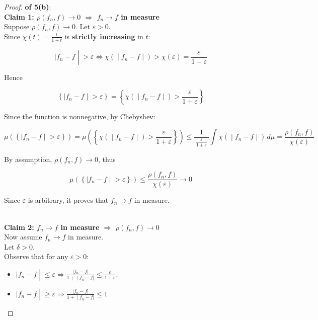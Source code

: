 \begin{proof}

\textbf{of 5(b)}:\\
\textbf{Claim 1: \(\rho(f_{n},f)\rightarrow 0\) \(\Longrightarrow\) \(f_{n}\rightarrow f\) in measure}\\
Suppose \(\rho(f_{n},f)\rightarrow 0\). Let \(\varepsilon > 0\).\\
Since \(\chi(t) = \frac{t}{1 + t}\) is \textbf{strictly increasing} in \(t\):

\[\left. |f_{n} - f \middle| > \varepsilon\Leftrightarrow\chi( \middle| f_{n} - f \middle| ) > \chi(\varepsilon) = \frac{\varepsilon}{1 + \varepsilon} \right.\]

Hence

\[\left\{ |f_{n} - f \middle| > \varepsilon \right\} = \left\{ \chi( \middle| f_{n} - f \middle| ) > \frac{\varepsilon}{1 + \varepsilon} \right\}\]

Since the function is nonnegative, by Chebyshev:

\[\left. \mu(\left\{ |f_{n} - f \middle| > \varepsilon \right\}) = \mu(\left\{ \chi( \middle| f_{n} - f \middle| ) > \frac{\varepsilon}{1 + \varepsilon} \right\}) \leq \frac{1}{\,\frac{\varepsilon}{1 + \varepsilon}\,}\int\chi( \middle| f_{n} - f \middle| )\, d\mu = \frac{\rho(f_{n},f)}{\chi(\varepsilon)} \right.\]

By assumption, \(\rho(f_{n},f)\rightarrow 0\), thus

\[\mu(\left\{ |f_{n} - f \middle| > \varepsilon \right\}) \leq \frac{\rho(f_{n},f)}{\chi(\varepsilon)}\rightarrow 0\]

Since \(\varepsilon\) is arbitrary, it proves that \(f_{n}\rightarrow f\) in measure.\\
\strut \\
\textbf{Claim 2: \(f_{n}\rightarrow f\) in measure \(\Longrightarrow\) \(\rho(f_{n},f)\rightarrow 0\)}\\
Now assume \(f_{n}\rightarrow f\) in measure.\\
Let \(\delta > 0\).\\
Observe that for any \(\varepsilon > 0\):

\begin{itemize}
\item
  \(\left. |f_{n} - f \middle| \leq \varepsilon\Longrightarrow\frac{|f_{n} - f|}{\left. 1 + \middle| f_{n} - f| \right.} \leq \frac{\varepsilon}{1 + \varepsilon} \right.\).
\item
  \(\left. |f_{n} - f \middle| \geq \varepsilon\Longrightarrow\frac{|f_{n} - f|}{\left. 1 + \middle| f_{n} - f| \right.} \leq 1 \right.\)
\end{itemize}


\end{proof}
